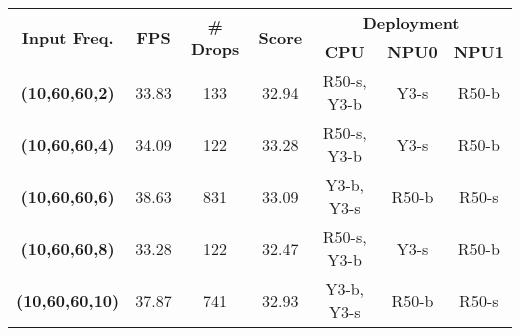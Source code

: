 \begin{tabular}{ccccccc}
\hline 
\multirow{2}{*}{\textbf{Input Freq.}} & \multirow{2}{*}{\textbf{FPS}} & \multirow{2}{*}{\textbf{\# Drops}} & \multirow{2}{*}{\textbf{Score}} & \multicolumn{3}{c}{\textbf{Deployment}}\tabularnewline
\cline{5-7}
 &  &  &  & \textbf{CPU} & \textbf{NPU0} & \textbf{NPU1}\tabularnewline
\hline 
\textbf{(10,60,60,2)} & 33.83 & 133 & 32.94 & R50-s, Y3-b & Y3-s & R50-b\tabularnewline
\textbf{(10,60,60,4)} & 34.09 & 122 & 33.28 & R50-s, Y3-b & Y3-s & R50-b\tabularnewline
\textbf{(10,60,60,6)} & 38.63 & 831 & 33.09 & Y3-b, Y3-s & R50-b & R50-s\tabularnewline
\textbf{(10,60,60,8)} & 33.28 & 122 & 32.47 & R50-s, Y3-b & Y3-s & R50-b\tabularnewline
\textbf{(10,60,60,10)} & 37.87 & 741 & 32.93 & Y3-b, Y3-s & R50-b & R50-s\tabularnewline
\hline 
\end{tabular}
